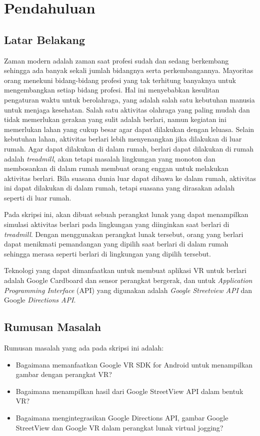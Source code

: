 \chapter{Pendahuluan}
\label{chap:intro}
   
\section{Latar Belakang}
\label{sec:label}

Zaman modern adalah zaman saat profesi sudah dan sedang berkembang sehingga ada banyak sekali jumlah bidangnya serta perkembangannya. Mayoritas orang menekuni bidang-bidang profesi yang tak terhitung banyaknya untuk mengembangkan setiap bidang profesi. Hal ini menyebabkan kesulitan pengaturan waktu untuk berolahraga, yang adalah salah satu kebutuhan manusia untuk menjaga kesehatan. Salah satu aktivitas olahraga yang paling mudah dan tidak memerlukan gerakan yang sulit adalah berlari, namun kegiatan ini memerlukan lahan yang cukup besar agar dapat dilakukan dengan leluasa. Selain kebutuhan lahan, aktivitas berlari lebih menyenangkan jika dilakukan di luar rumah. Agar dapat dilakukan di dalam rumah, berlari dapat dilakukan di rumah adalah {\it treadmill}, akan tetapi masalah lingkungan yang monoton dan membosankan di dalam rumah membuat orang enggan untuk melakukan aktivitas berlari. Bila suasana dunia luar dapat dibawa ke dalam rumah, aktivitas ini dapat dilakukan di dalam rumah, tetapi suasana yang dirasakan adalah seperti di luar rumah. 

Pada skripsi ini, akan dibuat sebuah perangkat lunak yang dapat menampilkan simulasi aktivitas berlari pada lingkungan yang diinginkan saat berlari di {\it treadmill}. Dengan menggunakan perangkat lunak tersebut, orang yang berlari dapat menikmati pemandangan yang dipilih saat berlari di dalam rumah sehingga merasa seperti berlari di lingkungan yang dipilih tersebut.

Teknologi yang dapat dimanfaatkan untuk membuat aplikasi VR untuk berlari adalah Google Cardboard dan sensor perangkat bergerak, dan untuk {\it Application Programming Interface} (API) yang digunakan adalah {\it Google Streetview API}  dan Google {\it Directions API}.

\section{Rumusan Masalah}
\label{sec:rumusan}
Rumusan masalah yang ada pada skripsi ini adalah:
\begin{itemize}
	\item Bagaimana memanfaatkan Google VR SDK for Android untuk menampilkan gambar dengan perangkat VR?
	\item Bagaimana menampilkan hasil dari Google StreetView API dalam bentuk VR?
	\item Bagaimana mengintegrasikan Google Directions API, gambar Google StreetView dan Google VR dalam perangkat lunak virtual jogging?
\end{itemize}

